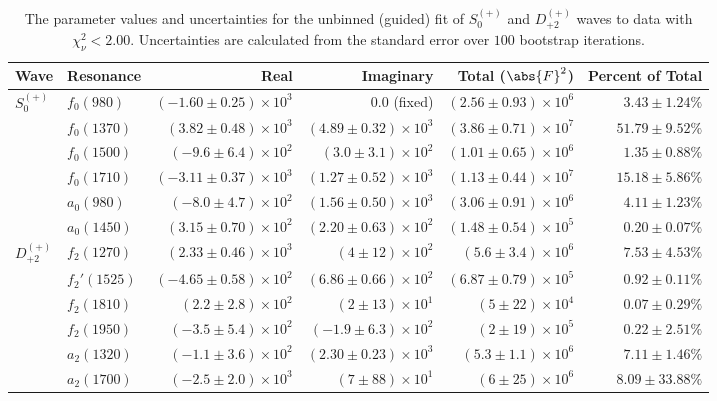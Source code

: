 \begin{table}[ht]
    \begin{center}
        \begin{tabular}{llrrrr}\toprule
        Wave & Resonance & Real & Imaginary & Total ($\abs{F}^2$) & Percent of Total \\\midrule
$S_{0}^{(+)}$ & $f_{0}(980)$ & $(-1.60 \pm 0.25) \times 10^{3}$ & $0.0$ (fixed) & $(2.56 \pm 0.93) \times 10^{6}$ & $3.43 \pm 1.24 \%$ \\
 & $f_{0}(1370)$ & $(3.82 \pm 0.48) \times 10^{3}$ & $(4.89 \pm 0.32) \times 10^{3}$ & $(3.86 \pm 0.71) \times 10^{7}$ & $51.79 \pm 9.52 \%$ \\
 & $f_{0}(1500)$ & $(-9.6 \pm 6.4) \times 10^{2}$ & $(3.0 \pm 3.1) \times 10^{2}$ & $(1.01 \pm 0.65) \times 10^{6}$ & $1.35 \pm 0.88 \%$ \\
 & $f_{0}(1710)$ & $(-3.11 \pm 0.37) \times 10^{3}$ & $(1.27 \pm 0.52) \times 10^{3}$ & $(1.13 \pm 0.44) \times 10^{7}$ & $15.18 \pm 5.86 \%$ \\
 & $a_{0}(980)$ & $(-8.0 \pm 4.7) \times 10^{2}$ & $(1.56 \pm 0.50) \times 10^{3}$ & $(3.06 \pm 0.91) \times 10^{6}$ & $4.11 \pm 1.23 \%$ \\
 & $a_{0}(1450)$ & $(3.15 \pm 0.70) \times 10^{2}$ & $(2.20 \pm 0.63) \times 10^{2}$ & $(1.48 \pm 0.54) \times 10^{5}$ & $0.20 \pm 0.07 \%$ \\
$D_{+2}^{(+)}$ & $f_{2}(1270)$ & $(2.33 \pm 0.46) \times 10^{3}$ & $(4 \pm 12) \times 10^{2}$ & $(5.6 \pm 3.4) \times 10^{6}$ & $7.53 \pm 4.53 \%$ \\
 & $f_{2}'(1525)$ & $(-4.65 \pm 0.58) \times 10^{2}$ & $(6.86 \pm 0.66) \times 10^{2}$ & $(6.87 \pm 0.79) \times 10^{5}$ & $0.92 \pm 0.11 \%$ \\
 & $f_{2}(1810)$ & $(2.2 \pm 2.8) \times 10^{2}$ & $(2 \pm 13) \times 10^{1}$ & $(5 \pm 22) \times 10^{4}$ & $0.07 \pm 0.29 \%$ \\
 & $f_{2}(1950)$ & $(-3.5 \pm 5.4) \times 10^{2}$ & $(-1.9 \pm 6.3) \times 10^{2}$ & $(2 \pm 19) \times 10^{5}$ & $0.22 \pm 2.51 \%$ \\
 & $a_{2}(1320)$ & $(-1.1 \pm 3.6) \times 10^{2}$ & $(2.30 \pm 0.23) \times 10^{3}$ & $(5.3 \pm 1.1) \times 10^{6}$ & $7.11 \pm 1.46 \%$ \\
 & $a_{2}(1700)$ & $(-2.5 \pm 2.0) \times 10^{3}$ & $(7 \pm 88) \times 10^{1}$ & $(6 \pm 25) \times 10^{6}$ & $8.09 \pm 33.88 \%$ \\\bottomrule
        \end{tabular}
    \caption{The parameter values and uncertainties for the unbinned (guided) fit of $S_{0}^{(+)}$ and $D_{+2}^{(+)}$ waves to data with $\chi^2_\nu < 2.00$. Uncertainties are calculated from the standard error over $100$ bootstrap iterations.}\label{tab:unbinned-fit-chisqdof-2.0-guided-Sp0p-Dp2p}
    \end{center}
\end{table}
